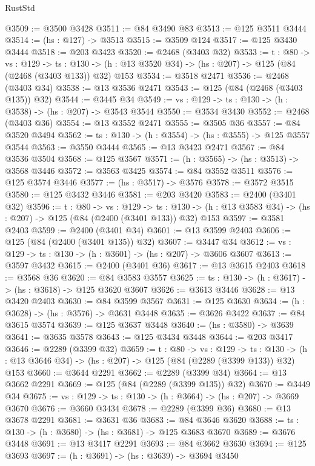\begin{lexlean}{RustStd}
\begin{coremodule}
{\begin{coremodule}
{{{{{{{{{{{{{{{@3509 := @3500 @3428
@3511 := @84 @3490 @83
@3513 := @125 @3511 @3444
@3514 := (hs : @127) -> @3513
@3515 := @3509 @124
@3517 := @125 @3430 @3444
@3518 := @203 @3423
@3520 := @2468 (@3403 @32)
@3533 := {t : @80} ->
  {vs : @129} ->
  {ts : @130} -> (h : @13 @3520 @34) -> (hs : @207) -> @125 (@84 (@2468 (@3403 @133)) @32) @153
@3534 := @3518 @2471
@3536 := @2468 (@3403 @34)
@3538 := @13 @3536 @2471
@3543 := @125 (@84 (@2468 (@3403 @135)) @32)
@3544 := @3445 @34
@3549 := {vs : @129} -> {ts : @130} -> (h : @3538) -> (hs : @207) -> @3543 @3544
@3550 := @3534 @3430
@3552 := @2468 (@3403 @36)
@3554 := @13 @3552 @2471
@3555 := @3505 @36
@3557 := @84 @3520 @3494
@3562 := {ts : @130} -> (h : @3554) -> (hs : @3555) -> @125 @3557 @3544
@3563 := @3550 @3444
@3565 := @13 @3423 @2471
@3567 := @84 @3536 @3504
@3568 := @125 @3567
@3571 := (h : @3565) -> (hs : @3513) -> @3568 @3446
@3572 := @3563 @3425
@3574 := @84 @3552 @3511
@3576 := @125 @3574 @3446
@3577 := (hs : @3517) -> @3576
@3578 := @3572 @3515
@3580 := @125 @3432 @3446
@3581 := @203 @3420
@3583 := @2400 (@3401 @32)
@3596 := {t : @80} ->
  {vs : @129} ->
  {ts : @130} -> (h : @13 @3583 @34) -> (hs : @207) -> @125 (@84 (@2400 (@3401 @133)) @32) @153
@3597 := @3581 @2403
@3599 := @2400 (@3401 @34)
@3601 := @13 @3599 @2403
@3606 := @125 (@84 (@2400 (@3401 @135)) @32)
@3607 := @3447 @34
@3612 := {vs : @129} -> {ts : @130} -> (h : @3601) -> (hs : @207) -> @3606 @3607
@3613 := @3597 @3432
@3615 := @2400 (@3401 @36)
@3617 := @13 @3615 @2403
@3618 := @3568 @36
@3620 := @84 @3583 @3557
@3625 := {ts : @130} -> (h : @3617) -> (hs : @3618) -> @125 @3620 @3607
@3626 := @3613 @3446
@3628 := @13 @3420 @2403
@3630 := @84 @3599 @3567
@3631 := @125 @3630
@3634 := (h : @3628) -> (hs : @3576) -> @3631 @3448
@3635 := @3626 @3422
@3637 := @84 @3615 @3574
@3639 := @125 @3637 @3448
@3640 := (hs : @3580) -> @3639
@3641 := @3635 @3578
@3643 := @125 @3434 @3448
@3644 := @203 @3417
@3646 := @2289 (@3399 @32)
@3659 := {t : @80} ->
  {vs : @129} ->
  {ts : @130} -> (h : @13 @3646 @34) -> (hs : @207) -> @125 (@84 (@2289 (@3399 @133)) @32) @153
@3660 := @3644 @2291
@3662 := @2289 (@3399 @34)
@3664 := @13 @3662 @2291
@3669 := @125 (@84 (@2289 (@3399 @135)) @32)
@3670 := @3449 @34
@3675 := {vs : @129} -> {ts : @130} -> (h : @3664) -> (hs : @207) -> @3669 @3670
@3676 := @3660 @3434
@3678 := @2289 (@3399 @36)
@3680 := @13 @3678 @2291
@3681 := @3631 @36
@3683 := @84 @3646 @3620
@3688 := {ts : @130} -> (h : @3680) -> (hs : @3681) -> @125 @3683 @3670
@3689 := @3676 @3448
@3691 := @13 @3417 @2291
@3693 := @84 @3662 @3630
@3694 := @125 @3693
@3697 := (h : @3691) -> (hs : @3639) -> @3694 @3450
}}}}}}}}}}}}}}}
\end{coremodule}}
\end{coremodule}
\end{lexlean}
